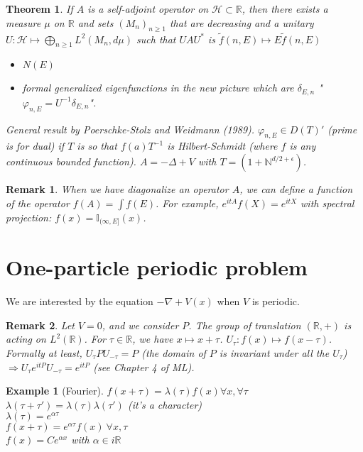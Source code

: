 \documentclass{article}
\newtheorem*{theorem}{Theorem}
\newtheorem*{example}{Example}
\newtheorem*{remark}{Remark}
\newcommand{\RR}{\mathbb{R}}
\newcommand{\II}{\mathbb{I}}
\newcommand{\NN}{\mathbb{N}}
\newcommand{\cH}{\mathcal{H}}
\newcommand{\eps}{\epsilon}
\newcommand{\la}{\lambda}
\begin{document}
\begin{theorem}
  If $A$ is a self-adjoint operator on $\cH \subset \RR$, 
  then there exists a measure $\mu$ on $\RR$ and sets $(M_n)_{n \ge 1}$ that are decreasing and a unitary 
  $U \colon \cH \mapsto \bigoplus_{n \ge 1} L^2(M_n,d\mu)$
  such that $U A U^*$ is $\tilde{f}(n,E) \mapsto E \tilde{f}(n,E)$
  \begin{itemize}
    \item $N(E)$
    \item formal generalized eigenfunctions in the new picture which are $\delta_{E,n}$ "$\varphi_{n,E} = U^{-1} \delta_{E,n}$". 
  \end{itemize}
  General result by Poerschke-Stolz and Weidmann (1989).
  $\varphi_{n,E} \in D(T)'$ (prime is for dual) if $T$ is so that $f(a) T^{-1}$ is Hilbert-Schmidt (where $f$ is any continuous bounded function).
  $A = -\Delta + V$ with $T = (1+\NN^{d/2+\eps})$.
\end{theorem}

\begin{remark}
  When we have diagonalize an operator $A$, we can define a function of the operator $f(A) = \int f(E)$. 
  For example, $e^{itA} f(X) = e^{itX}$ with spectral projection: $f(x) = \II_{(\infty,E]} (x)$.
\end{remark}

\section{One-particle periodic problem}

We are interested by the equation $-\nabla + V(x)$ when $V$ is periodic.
\\

\begin{remark} 
  Let $V = 0$, and we consider $P$. 
  The group of translation $(\RR,+)$ is acting on $L^2(\RR)$.
  For $\tau \in \RR$, we have $x \mapsto x + \tau$. $U_\tau \colon f(x) \mapsto f(x-\tau)$.
  Formally at least, $U_\tau P U_{-\tau} = P$ (the domain of $P$ is invariant under all the $U_\tau$)
  $ \Rightarrow U_{\tau} e^{itP} U_{-\tau} = e^{itP}$ (see Chapter 4 of ML).
\end{remark} 

\begin{example}[Fourier]
    $f(x+\tau) = \la(\tau)f(x) \forall x, \forall \tau$\\
    $\la(\tau+\tau') = \la(\tau)\la(\tau')$ (it's a character)\\
    $\la(\tau) = e^{\alpha \tau}$\\
    $f(x+\tau) = e^{\alpha\tau} f(x) \ \forall x,\tau$\\
    $f(x) = C e^{\alpha x}$ with $\alpha \in i\RR$\\
\end{example}
\end{document}
